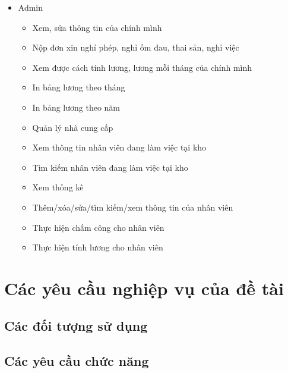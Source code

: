 \documentclass[a4paper,12pt]{report}
\begin{document}
\begin{itemize}
\begin{itemize}
              \item Thêm/xóa/sửa/tìm kiếm/xem thông tin của nhân viên
              \item Thực hiện chấm công cho nhân viên
              \item Thực hiện tính lương cho nhân viên
          \end{itemize}
    \item Admin
          \begin{itemize}
              \item Xem, sửa thông tin của chính mình
              \item Nộp đơn xin nghỉ phép, nghỉ ốm đau, thai sản, nghỉ việc
              \item Xem được cách tính lương, lương mỗi tháng của chính mình
              \item In bảng lương theo tháng
              \item In bảng lương theo năm
              \item Quản lý nhà cung cấp
              \item Xem thông tin nhân viên đang làm việc tại kho
              \item Tìm kiếm nhân viên đang làm việc tại kho
              \item Xem thống kê
              \item Thêm/xóa/sửa/tìm kiếm/xem thông tin của nhân viên
              \item Thực hiện chấm công cho nhân viên
              \item Thực hiện tính lương cho nhân viên
          \end{itemize}
\end{itemize}


\section{Các yêu cầu nghiệp vụ của đề tài}
\subsection{Các đối tượng sử dụng}
\subsection{Các yêu cầu chức năng}
\end{document}

